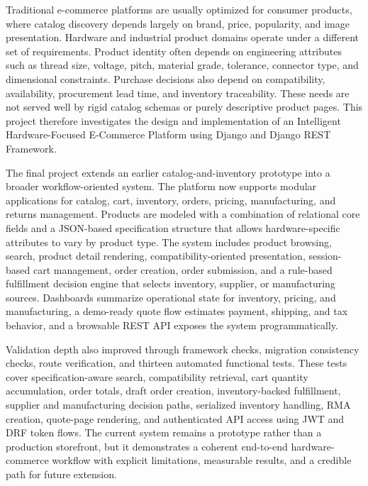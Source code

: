 \documentclass[12pt,letterpaper,oneside,openany]{book}
\begin{document}
\begin{justifying}
Traditional e-commerce platforms are usually optimized for consumer products,
where catalog discovery depends largely on brand, price, popularity, and image
presentation. Hardware and industrial product domains operate under a different
set of requirements. Product identity often depends on engineering attributes
such as thread size, voltage, pitch, material grade, tolerance, connector type,
and dimensional constraints. Purchase decisions also depend on compatibility,
availability, procurement lead time, and inventory traceability. These needs
are not served well by rigid catalog schemas or purely descriptive product
pages. This project therefore investigates the design and implementation of an
Intelligent Hardware-Focused E-Commerce Platform using Django and Django REST
Framework.
\end{justifying}

\begin{justifying}
The final project extends an earlier catalog-and-inventory prototype into a
broader workflow-oriented system. The platform now supports modular
applications for catalog, cart, inventory, orders, pricing, manufacturing, and
returns management. Products are modeled with a combination of relational core
fields and a JSON-based specification structure that allows hardware-specific
attributes to vary by product type. The system includes product browsing,
search, product detail rendering, compatibility-oriented presentation,
session-based cart management, order creation, order submission, and a
rule-based fulfillment decision engine that selects inventory, supplier, or
manufacturing sources. Dashboards summarize operational state for inventory,
pricing, and manufacturing, a demo-ready quote flow estimates payment,
shipping, and tax behavior, and a browsable REST API exposes the system
programmatically.
\end{justifying}

\begin{justifying}
Validation depth also improved through framework checks, migration consistency
checks, route verification, and thirteen automated functional tests. These
tests cover specification-aware search, compatibility retrieval, cart quantity
accumulation, order totals, draft order creation, inventory-backed fulfillment,
supplier and manufacturing decision paths, serialized inventory handling, RMA
creation, quote-page rendering, and authenticated API access using JWT and DRF
token flows. The current system remains a prototype rather than a production
storefront, but it demonstrates a coherent end-to-end hardware-commerce
workflow with explicit limitations, measurable results, and a credible path for
future extension.
\end{justifying}
\end{document}

